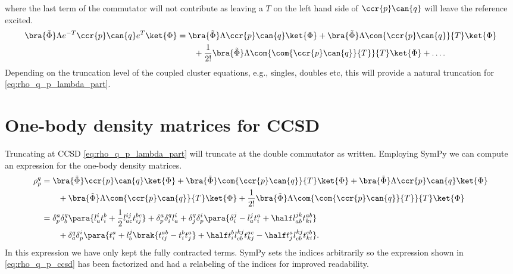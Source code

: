     where the last term of the commutator will not contribute as leaving a $T$
    on the left hand side of $\ccr{p}\can{q}$ will leave the reference excited.
    \begin{align}
        \bra{\tilde{\Phi}}\Lambda e^{-T}\ccr{p}\can{q}e^T\ket{\Phi}
        &= \bra{\tilde{\Phi}}\Lambda \ccr{p}\can{q}\ket{\Phi}
        + \bra{\tilde{\Phi}}\Lambda \com{\ccr{p}\can{q}}{T}\ket{\Phi}
        \nonumber \\
        &\qquad
        + \frac{1}{2!}
        \bra{\tilde{\Phi}}\Lambda \com{\com{\ccr{p}\can{q}}{T}}{T}\ket{\Phi}
        + \dots.
        \label{eq:rho_q_p_lambda_part}
    \end{align}
    Depending on the truncation level of the coupled cluster equations, e.g.,
    singles, doubles etc, this will provide a natural truncation for
    \autoref{eq:rho_q_p_lambda_part}.

    \section{One-body density matrices for CCSD}
        Truncating at CCSD \autoref{eq:rho_q_p_lambda_part} will truncate at the
        double commutator as written. Employing SymPy\cite{sympy} we can compute
        an expression for the one-body density matrices.
        \begin{align}
            \rho^{q}_{p}
            &= \bra{\tilde{\Phi}}\ccr{p}\can{q}\ket{\Phi}
            + \bra{\tilde{\Phi}}\com{\ccr{p}\can{q}}{T}\ket{\Phi}
            + \bra{\tilde{\Phi}}\Lambda \ccr{p}\can{q}\ket{\Phi}
            \nonumber \\
            &\qquad
            + \bra{\tilde{\Phi}}\Lambda \com{\ccr{p}\can{q}}{T}\ket{\Phi}
            + \frac{1}{2!}
            \bra{\tilde{\Phi}}\Lambda \com{\com{\ccr{p}\can{q}}{T}}{T}\ket{\Phi}
            \\
            &=
            \delta^a_p \delta^q_b \para{
                l^i_a t^b_i + \frac{1}{2} l^{ij}_{ac} t^{bc}_{ij}
            }
            + \delta^a_p \delta^q_i l^i_a
            + \delta^q_j \delta^i_p \para{
                \delta^j_i
                - l^j_a t^a_i
                + \half l^{jk}_{ab} t^{ab}_{ki}
            }
            \nonumber \\
            &\qquad
            + \delta^q_a \delta^i_p \para{
                t^a_i
                + l^j_b \brak{
                    t^{ab}_{ij} - t^b_i t^a_j
                }
                + \half t^{b}_{i} l^{kj}_{cb} t^{ac}_{kj}
                - \half t^{a}_{j} l^{kj}_{cb} t^{cb}_{ki}
            }.
            \label{eq:rho_q_p_ccsd}
        \end{align}
        In this expression we have only kept the fully contracted terms. SymPy
        sets the indices arbitrarily so the expression shown in
        \autoref{eq:rho_q_p_ccsd} has been factorized and had a relabeling of
        the indices for improved readability.
